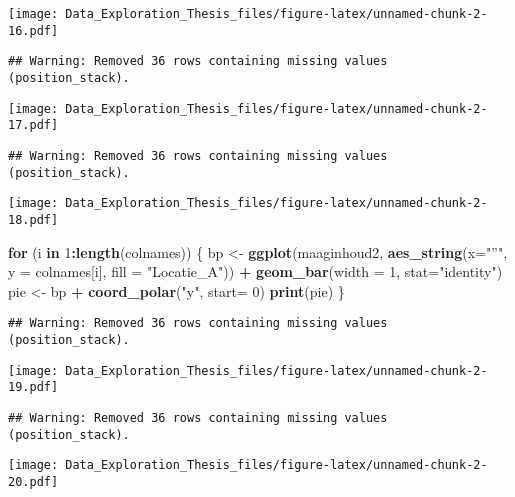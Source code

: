\documentclass[]{article}
\newenvironment{Shaded}{\begin{snugshade}}{\end{snugshade}}
\newcommand{\KeywordTok}[1]{\textcolor[rgb]{0.13,0.29,0.53}{\textbf{#1}}}
\newcommand{\DataTypeTok}[1]{\textcolor[rgb]{0.13,0.29,0.53}{#1}}
\newcommand{\DecValTok}[1]{\textcolor[rgb]{0.00,0.00,0.81}{#1}}
\newcommand{\StringTok}[1]{\textcolor[rgb]{0.31,0.60,0.02}{#1}}
\newcommand{\ControlFlowTok}[1]{\textcolor[rgb]{0.13,0.29,0.53}{\textbf{#1}}}
\newcommand{\OperatorTok}[1]{\textcolor[rgb]{0.81,0.36,0.00}{\textbf{#1}}}
\newcommand{\NormalTok}[1]{#1}
\begin{document}
\texttt{[image: Data\_Exploration\_Thesis\_files/figure-latex/unnamed-chunk-2-16.pdf]}

\begin{verbatim}
## Warning: Removed 36 rows containing missing values (position_stack).
\end{verbatim}

\texttt{[image: Data\_Exploration\_Thesis\_files/figure-latex/unnamed-chunk-2-17.pdf]}

\begin{verbatim}
## Warning: Removed 36 rows containing missing values (position_stack).
\end{verbatim}

\texttt{[image: Data\_Exploration\_Thesis\_files/figure-latex/unnamed-chunk-2-18.pdf]}

\begin{Shaded}
\begin{Highlighting}[]
\ControlFlowTok{for}\NormalTok{ (i }\ControlFlowTok{in} \DecValTok{1}\OperatorTok{:}\KeywordTok{length}\NormalTok{(colnames)) \{}
\NormalTok{  bp <-}\StringTok{ }\KeywordTok{ggplot}\NormalTok{(maaginhoud2, }\KeywordTok{aes_string}\NormalTok{(}\DataTypeTok{x=}\StringTok{"''"}\NormalTok{, }\DataTypeTok{y =}\NormalTok{ colnames[i], }\DataTypeTok{fill =} \StringTok{"Locatie_A"}\NormalTok{)) }\OperatorTok{+}
\StringTok{    }\KeywordTok{geom_bar}\NormalTok{(}\DataTypeTok{width =} \DecValTok{1}\NormalTok{, }\DataTypeTok{stat=}\StringTok{"identity"}\NormalTok{)}
\NormalTok{  pie <-}\StringTok{ }\NormalTok{bp }\OperatorTok{+}\StringTok{ }\KeywordTok{coord_polar}\NormalTok{(}\StringTok{"y"}\NormalTok{, }\DataTypeTok{start=} \DecValTok{0}\NormalTok{)}
  \KeywordTok{print}\NormalTok{(pie)}
\NormalTok{\}}
\end{Highlighting}
\end{Shaded}

\begin{verbatim}
## Warning: Removed 36 rows containing missing values (position_stack).
\end{verbatim}

\texttt{[image: Data\_Exploration\_Thesis\_files/figure-latex/unnamed-chunk-2-19.pdf]}

\begin{verbatim}
## Warning: Removed 36 rows containing missing values (position_stack).
\end{verbatim}

\texttt{[image: Data\_Exploration\_Thesis\_files/figure-latex/unnamed-chunk-2-20.pdf]}
\end{document}
